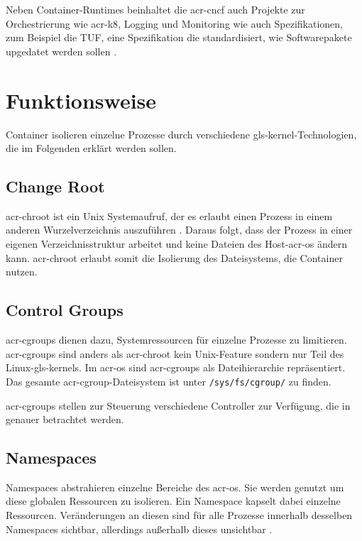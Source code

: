 Neben Container-Runtimes beinhaltet die \gls{acr-cncf} auch Projekte zur Orchestrierung wie \gls{acr-k8}, Logging und Monitoring wie auch Spezifikationen, zum Beispiel die TUF, eine Spezifikation die standardisiert, wie Softwarepakete upgedatet werden sollen \cite{CNCFCloudNativeInteractiveLandscape}. 

\section{Funktionsweise}
\label{sec:funktionsweise}

Container isolieren einzelne Prozesse durch verschiedene \gls{gls-kernel}-Technologien, die im Folgenden erklärt werden sollen.
\subsection{Change Root}
\label{sec:chroot}
\Gls{acr-chroot} ist ein Unix Systemaufruf, der es erlaubt einen Prozess in einem anderen Wurzelverzeichnis auszuführen \citep{Chroot1LinuxManualPage}. Daraus folgt, dass der Prozess in einer eigenen Verzeichnisstruktur arbeitet und keine Dateien des Host-\gls{acr-os} ändern kann. \Gls{acr-chroot} erlaubt somit die Isolierung des Dateisystems, die Container nutzen.

\subsection{Control Groups}
\label{sec:cgroups}
\glspl{acr-cgroup} dienen dazu, Systemressourcen für einzelne Prozesse zu limitieren. \Glspl{acr-cgroup} sind anders als \gls{acr-chroot} kein Unix-Feature sondern nur Teil des Linux-\glspl{gls-kernel}. Im \gls{acr-os} sind \glspl{acr-cgroup} als Dateihierarchie repräsentiert. Das gesamte \gls{acr-cgroup}-Dateisystem ist unter \texttt{/sys/fs/cgroup/} zu finden.

\Glspl{acr-cgroup} stellen zur Steuerung verschiedene Controller zur Verfügung, die in  genauer betrachtet werden.

\subsection{Namespaces}
\label{sec:namespaces}
Namespaces abstrahieren einzelne Bereiche des \gls{acr-os}. Sie werden genutzt um diese globalen Ressourcen zu isolieren. Ein Namespace kapselt dabei einzelne Ressourcen. Veränderungen an diesen sind für alle Prozesse innerhalb desselben Namespaces sichtbar, allerdings außerhalb dieses unsichtbar \citep{Namespaces7LinuxManualPage}.


